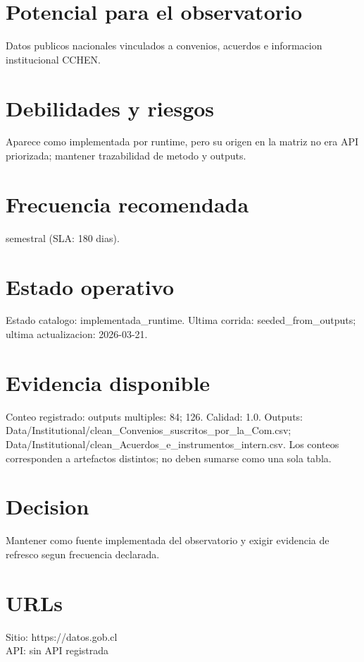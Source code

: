 \documentclass[10pt,a4paper]{article}
\begin{document}
\section*{Potencial para el observatorio}
Datos publicos nacionales vinculados a convenios, acuerdos e informacion institucional CCHEN.

\section*{Debilidades y riesgos}
Aparece como implementada por runtime, pero su origen en la matriz no era API priorizada; mantener trazabilidad de metodo y outputs.

\section*{Frecuencia recomendada}
semestral (SLA: 180 dias).

\section*{Estado operativo}
Estado catalogo: implementada\_runtime. Ultima corrida: seeded\_from\_outputs; ultima actualizacion: 2026-03-21.

\section*{Evidencia disponible}
Conteo registrado: outputs multiples: 84; 126. Calidad: 1.0. Outputs: Data/Institutional/clean\_Convenios\_suscritos\_por\_la\_Com.csv; Data/Institutional/clean\_Acuerdos\_e\_instrumentos\_intern.csv. Los conteos corresponden a artefactos distintos; no deben sumarse como una sola tabla.

\section*{Decision}
Mantener como fuente implementada del observatorio y exigir evidencia de refresco segun frecuencia declarada.


\section*{URLs}
Sitio: https://datos.gob.cl\\
API: sin API registrada
\end{document}
